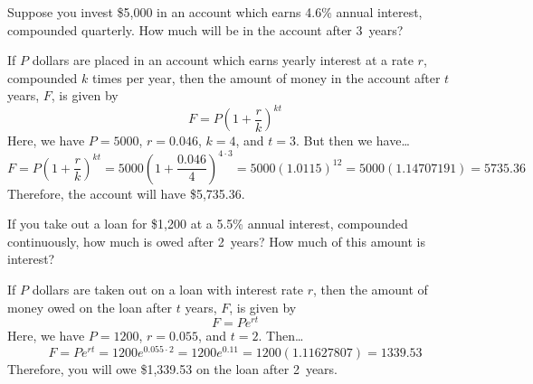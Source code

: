 \documentclass[11pt,letterpaper]{article}
\begin{document}
\newpage



 Suppose you invest \$5,000 in an account which earns 4.6\% annual interest, compounded quarterly. How much will be in the account after 3~years? \pspace

\sol If $P$ dollars are placed in an account which earns yearly interest at a rate $r$, compounded $k$ times per year, then the amount of money in the account after $t$ years, $F$, is given by \pspace
	\[
	F= P \left(1 + \dfrac{r}{k} \right)^{kt}
	\] \pspace
Here, we have $P= 5000$, $r= 0.046$, $k= 4$, and $t= 3$. But then we have\dots \pspace
	\[
	F= P \left(1 + \dfrac{r}{k} \right)^{kt}= 5000 \left( 1 + \dfrac{0.046}{4} \right)^{4 \cdot 3}= 5000 (1.0115)^{12}= 5000(1.14707191)= 5735.36
	\] \pspace
Therefore, the account will have \$5,735.36. 



\newpage


 If you take out a loan for \$1,200 at a 5.5\% annual interest, compounded continuously, how much is owed after 2~years? How much of this amount is interest? \pspace

\sol If $P$ dollars are taken out on a loan with interest rate $r$, then the amount of money owed on the loan after $t$ years, $F$, is given by \pspace
	\[
	F= P e^{rt}
	\] \pspace
Here, we have $P= 1200$, $r= 0.055$, and $t= 2$. Then\dots \pspace
	\[
	F= Pe^{rt}= 1200 e^{0.055 \cdot 2}= 1200 e^{0.11}= 1200(1.11627807)= 1339.53
	\] \pspace
Therefore, you will owe \$1,339.53 on the loan after 2~years. 
\end{document}
